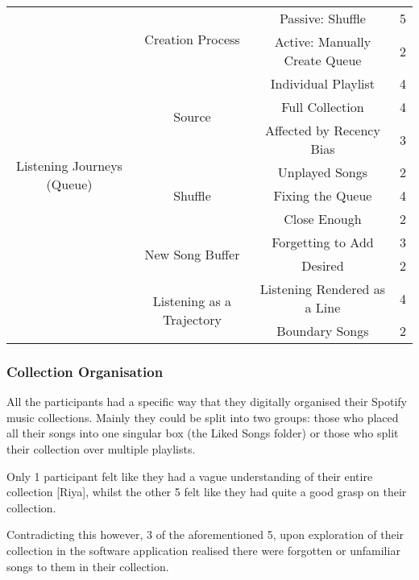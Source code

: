 \begin{longtable}[c]{| c | c | c | c}
    \multirow{12}{6em}{Listening Journeys (Queue)} & \multirow{2}{*}{Creation Process} & Passive: Shuffle & 5\\*
    \cmidrule{3-4}
            & & Active: Manually Create Queue & 2\\*
        \cmidrule{2-4}
        & \multirow{3}{*}{Source} & Individual Playlist & 4\\*
        \cmidrule{3-4}
            & & Full Collection & 4\\*
            \cmidrule{3-4}
            & & Affected by Recency Bias & 3\\*
        \cmidrule{2-4}
        & \multirow{3}{*}{Shuffle} & Unplayed Songs & 2\\*
        \cmidrule{3-4}
            & & Fixing the Queue & 4\\*
            \cmidrule{3-4}
            & & Close Enough & 2\\*
        \cmidrule{2-4}
        & \multirow{2}{*}{New Song Buffer} & Forgetting to Add & 3\\*
        \cmidrule{3-4}
            & & Desired & 2\\*
        \cmidrule{2-4}
        & \multirow{2}{*}{Listening as a Trajectory} & Listening Rendered as a Line & 4\\*
        \cmidrule{3-4}
            & & Boundary Songs & 2\\*%
    \midrule
\end{longtable}

\subsubsection{Collection Organisation}%
All the participants had a specific way that they digitally organised their Spotify music collections. Mainly they could be split into two groups: those who placed all their songs into one singular box (the Liked Songs folder) or those who split their collection over multiple playlists.

Only 1 participant felt like they had a vague understanding of their entire collection [Riya], whilst the other 5 felt like they had quite a good grasp on their collection.

Contradicting this however, 3 of the aforementioned 5, upon exploration of their collection in the software application realised there were forgotten or unfamiliar songs to them in their collection.

